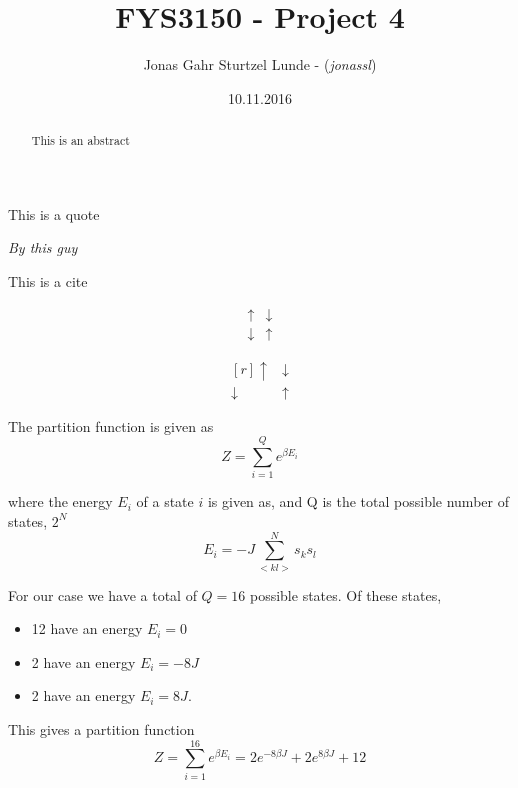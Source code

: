 \documentclass[10pt,a4paper]{article}
\begin{document}
\title{FYS3150 - Project 4}
\author{
	\begin{tabular}{rl}
		Jonas Gahr Sturtzel Lunde - (\textit{jonassl})\\
	\end{tabular}}
\date{10.11.2016}
\maketitle



\setlength{\epigraphwidth}{0.75\textwidth}
\renewcommand{\epigraphflush}{center}
\renewcommand{\beforeepigraphskip}{50pt}
\renewcommand{\afterepigraphskip}{100pt}
\renewcommand{\epigraphsize}{\normalsize}
\epigraph{This is a quote}
	{\textit{By this guy}}



\begin{abstract}
\noindent
This is an abstract
\end{abstract}
\pagebreak



This is a cite\cite{lecture_notes}

\[
\begin{matrix*}
\uparrow & \downarrow \\
\downarrow & \uparrow
\end{matrix*}
\]

\[
\begin{matrix*}[r]
\uparrow & \downarrow \\
\downarrow & \uparrow
\end{matrix*}
\]


The partition function is given as
\begin{equation}
Z = \sum\limits_{i=1}^Q e^{\beta E_i}
\end{equation}

where the energy $E_i$ of a state $i$ is given as, and Q is the total possible number of states, $2^N$
\begin{equation}
E_i = -J \sum\limits_{<kl>}^N s_k s_l
\end{equation}

For our case we have a total of $Q = 16$ possible states. Of these states,
\begin{itemize}
\item 12 have an energy $E_i = 0$
\item 2 have an energy $E_i = -8J$
\item 2 have an energy $E_i = 8J$.
\end{itemize}
This gives a partition function
\begin{equation}
Z = \sum\limits_{i=1}^16 e^{\beta E_i} = 2e^{-8\beta J} + 2e^{8\beta J} + 12
\end{equation}
\end{document}
